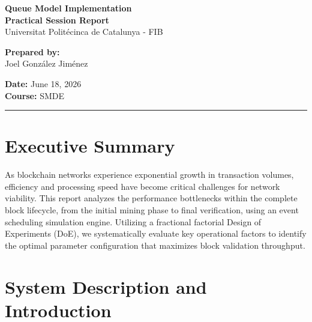 \documentclass[12pt,a4paper]{article}
\begin{document}
	
	\begin{center}
		{\Large \textbf{Queue Model Implementation}}	 \\[0.1cm]
		{\large \textbf{Practical Session Report}} \\[0.2cm]
		{\normalsize Universitat Politécinca de Catalunya - FIB} \\[0.6cm]
		
		\begin{minipage}{0.45\textwidth}
			\flushleft \small
			\textbf{Prepared by:} \\
			Joel González Jiménez \\
		\end{minipage}
		\hfill
		\begin{minipage}{0.45\textwidth}
			\flushright \small
			\textbf{Date:} June 18, 2026 \\
			\textbf{Course:} SMDE
		\end{minipage}
		\rule{\textwidth}{0.4pt}
	\end{center}
	
	\vspace{0.3cm}
	
	\section{Executive Summary}
	\label{sec:summary}
	As blockchain networks experience exponential growth in transaction volumes, efficiency and processing speed have become critical challenges for network viability. This report analyzes the performance bottlenecks within the complete block lifecycle, from the initial mining phase to final verification, using an event scheduling simulation engine. Utilizing a fractional factorial Design of Experiments (DoE), we systematically evaluate key operational factors to identify the optimal parameter configuration that maximizes block validation throughput.
	
	\section{System Description and Introduction}
	\label{sec:system_description}
	
\end{document}

